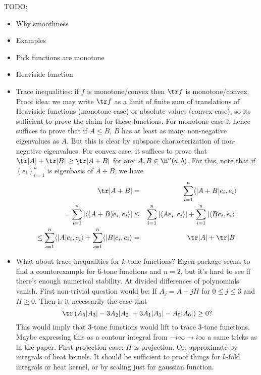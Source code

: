 TODO:

\begin{itemize}
	\item Why smoothness
	\item Examples
	\item Pick functions are monotone
	\item Heaviside function
	\item Trace inequalities: if $f$ is monotone/convex then $\tr f$ is monotone/convex. Proof idea: we may write $\tr f$ as a limit of finite sum of translations of Heaviside functions (monotone case) or absolute values (convex case), so its sufficient to prove the claim for these functions. For monotone case it hence suffices to prove that if $A \leq B$, $B$ has at least as many non-negative eigenvalues as $A$. But this is clear by subspace characterization of non-negative eigenvalues. For convex case, it suffices to prove that $\tr |A| + \tr |B| \geq \tr |A + B|$ for any $A, B \in \H^{n}(a, b)$. For this, note that if $(e_{i})_{i = 1}^{n}$ is eigenbasis of $A + B$, we have
	\begin{eqnarray*}
		\tr |A + B| &=& \sum_{i = 1}^{n} \langle |A + B| e_{i}, e_{i} \rangle \\
		= \sum_{i = 1}^{n} \left|\langle (A + B) e_{i}, e_{i} \rangle \right| &\leq& \sum_{i = 1}^{n} \left|\langle A e_{i}, e_{i} \rangle \right| + \sum_{i = 1}^{n} \left|\langle B e_{i}, e_{i} \rangle \right| \\
		\leq \sum_{i = 1}^{n} \langle |A| e_{i}, e_{i} \rangle + \sum_{i = 1}^{n} \langle |B| e_{i}, e_{i} \rangle &=& \tr |A| + \tr |B|
	\end{eqnarray*}
	\item What about trace inequalities for $k$-tone functions? Eigen-package seems to find a counterexample for $6$-tone functions and $n = 2$, but it's hard to see if there's enough numerical stability. At divided differences of polynomials vanish. First non-trivial question would be:
	If $A_{j} = A + j H$ for $0 \leq j \leq 3$ and $H \geq 0$. Then is it necessarily the case that
	\[
		\tr \left(A_{3} |A_{3}| - 3 A_{2}|A_{2}| + 3 A_{1} |A_{1}| - A_{0} |A_{0}| \right) \geq 0?
	\]
	This would imply that $3$-tone functions would lift to trace $3$-tone functions. Maybe expressing this as a contour integral from $-i \infty \to i \infty$ a same tricks as in the paper. First projection case: $H$ is projection. Or: approximate by integrals of heat kernels. It should be sufficient to proof things for $k$-fold integrals or heat kernel, or by scaling just for gaussian function.

\end{itemize}
